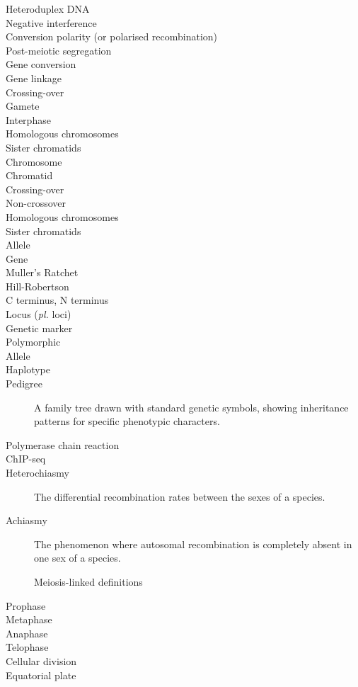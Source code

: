 \begin{alwayssingle}
\begin{description}
		\item[Heteroduplex DNA]
		\item[Negative interference]
		\item[Conversion polarity (or polarised recombination)]
		\item[Post-meiotic segregation]
		\item[Gene conversion]
		\item[Gene linkage]
		\item[Crossing-over]
		\item[Gamete]
		\item[Interphase]
		\item[Homologous chromosomes]
		\item[Sister chromatids]
		\item[Chromosome]
		\item[Chromatid]
		\item[Crossing-over]
		\item[Non-crossover]
		\item[Homologous chromosomes]
		\item[Sister chromatids]
		\item[Allele]
		\item[Gene]
		\item[Muller's Ratchet]
		\item[Hill-Robertson]
		\item[C terminus, N terminus]
		\item[Locus (\textit{pl.} loci)]
		\item[Genetic marker]
		\item[Polymorphic]
		\item[Allele]
		\item[Haplotype]
		\item[Pedigree] A family tree drawn with standard genetic symbols, showing inheritance patterns for specific phenotypic characters.
		\item[Polymerase chain reaction]
		\item[ChIP-seq]
		\item[Heterochiasmy] The differential recombination rates between the sexes of a species.
		\item[Achiasmy] The phenomenon where autosomal recombination is completely absent in one sex of a species.


Meiosis-linked definitions
\item[Prophase]
\item[Metaphase]
\item[Anaphase]
\item[Telophase]
\item[Cellular division]
\item[Equatorial plate]





	\end{description}
\end{alwayssingle}
\mtcaddchapter{}


